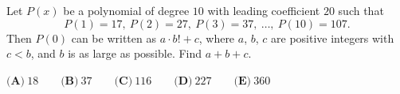 Let $P(x)$ be a polynomial of degree $10$ with leading coefficient $20$ such that
\[
P(1)=17,\ P(2)=27,\ P(3)=37,\ \dots,\ P(10)=107 .
\]
Then $P(0)$ can be written as $a\cdot b!+c$, where $a$, $b$, $c$ are positive integers with $c<b$, and $b$ is as large as possible. Find $a+b+c$.

$\textbf{(A)}\ 18\qquad\textbf{(B)}\ 37\qquad\textbf{(C)}\ 116\qquad\textbf{(D)}\ 227\qquad\textbf{(E)}\ 360$
